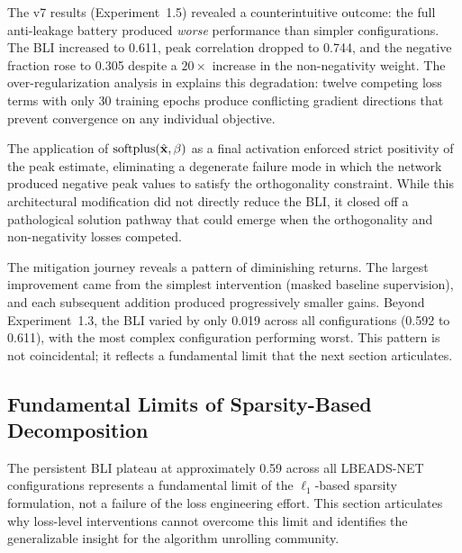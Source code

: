 The v7 results (Experiment~1.5) revealed a counterintuitive outcome: the full anti-leakage battery produced \emph{worse} performance than simpler configurations. The BLI increased to 0.611, peak correlation dropped to 0.744, and the negative fraction rose to 0.305 despite a $20\times$ increase in the non-negativity weight. The over-regularization analysis in  explains this degradation: twelve competing loss terms with only 30 training epochs produce conflicting gradient directions that prevent convergence on any individual objective.

The application of $\text{softplus}(\hat{\mathbf{x}}, \beta)$ as a final activation enforced strict positivity of the peak estimate, eliminating a degenerate failure mode in which the network produced negative peak values to satisfy the orthogonality constraint. While this architectural modification did not directly reduce the BLI, it closed off a pathological solution pathway that could emerge when the orthogonality and non-negativity losses competed.

The mitigation journey reveals a pattern of diminishing returns. The largest improvement came from the simplest intervention (masked baseline supervision), and each subsequent addition produced progressively smaller gains. Beyond Experiment~1.3, the BLI varied by only 0.019 across all configurations (0.592 to 0.611), with the most complex configuration performing worst. This pattern is not coincidental; it reflects a fundamental limit that the next section articulates.


\subsection{Fundamental Limits of Sparsity-Based Decomposition}
\label{sec:disc_leakage_fundamental}

The persistent BLI plateau at approximately 0.59 across all LBEADS-NET configurations represents a fundamental limit of the $\ell_1$-based sparsity formulation, not a failure of the loss engineering effort. This section articulates why loss-level interventions cannot overcome this limit and identifies the generalizable insight for the algorithm unrolling community.

